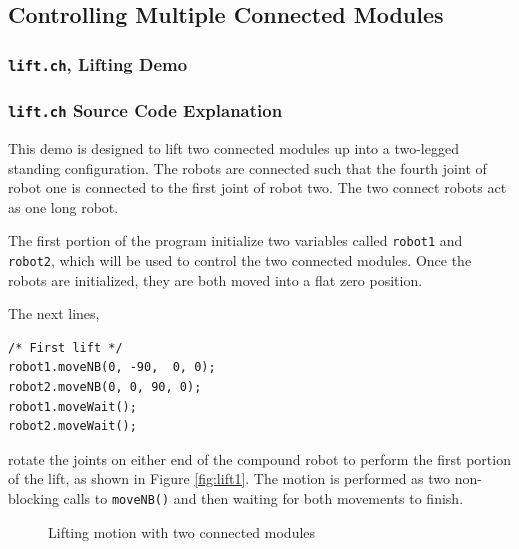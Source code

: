 \documentclass{article}
\begin{document}
\subsection{Controlling Multiple Connected Modules}
\subsubsection{\texttt{lift.ch}, Lifting Demo}

\subsubsection{\texttt{lift.ch} Source Code Explanation}
This demo is designed to lift two connected modules up into
a two-legged standing configuration. The robots are connected such that the fourth
joint of robot one is connected to the first joint of robot two. The two connect robots
act as one long robot.

The first portion of the program initialize two variables called \texttt{robot1} 
and \texttt{robot2}, which will be used to control the two connected modules.
Once the robots are initialized, they are both moved into a flat zero position.

The next lines,
\begin{verbatim}
/* First lift */
robot1.moveNB(0, -90,  0, 0);
robot2.moveNB(0, 0, 90, 0);
robot1.moveWait();
robot2.moveWait();
\end{verbatim}
rotate the joints on either end of the compound robot to perform the 
first portion of the lift, as shown in Figure \ref{fig:lift1}. The motion is performed as two non-blocking
calls to \texttt{moveNB()} and then waiting for both movements to finish.

\begin{figure}
  \centering
  \caption{Lifting motion with two connected modules}
  \label{fig:lift}
\end{figure}
\end{document}
